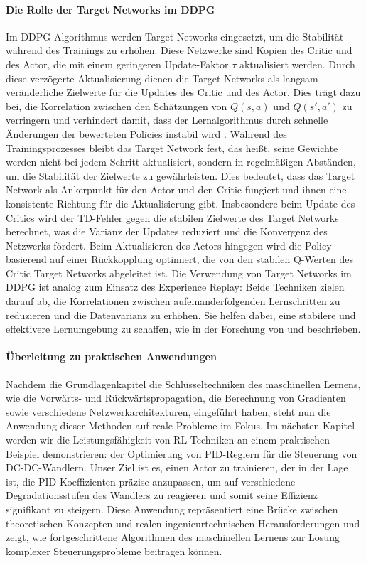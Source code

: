 \paragraph{Die Rolle der Target Networks im DDPG}
Im DDPG-Algorithmus werden Target Networks eingesetzt, um die Stabilität während des Trainings zu erhöhen. Diese Netzwerke sind Kopien des Critic und des Actor, die mit einem geringeren Update-Faktor \( \tau \) aktualisiert werden. Durch diese verzögerte Aktualisierung dienen die Target Networks als langsam veränderliche Zielwerte für die Updates des Critic und des Actor. Dies trägt dazu bei, die Korrelation zwischen den Schätzungen von \( Q(s,a) \) und \( Q(s',a') \) zu verringern und verhindert damit, dass der Lernalgorithmus durch schnelle Änderungen der bewerteten Policies instabil wird \cite{Wu2018AggregatedMultiDDPG}. Während des Trainingsprozesses bleibt das Target Network fest, das heißt, seine Gewichte werden nicht bei jedem Schritt aktualisiert, sondern in regelmäßigen Abständen, um die Stabilität der Zielwerte zu gewährleisten. Dies bedeutet, dass das Target Network als Ankerpunkt für den Actor und den Critic fungiert und ihnen eine konsistente Richtung für die Aktualisierung gibt. Insbesondere beim Update des Critics wird der TD-Fehler gegen die stabilen Zielwerte des Target Networks berechnet, was die Varianz der Updates reduziert und die Konvergenz des Netzwerks fördert. Beim Aktualisieren des Actors hingegen wird die Policy basierend auf einer Rückkopplung optimiert, die von den stabilen Q-Werten des Critic Target Networks abgeleitet ist. Die Verwendung von Target Networks im DDPG ist analog zum Einsatz des Experience Replay: Beide Techniken zielen darauf ab, die Korrelationen zwischen aufeinanderfolgenden Lernschritten zu reduzieren und die Datenvarianz zu erhöhen. Sie helfen dabei, eine stabilere und effektivere Lernumgebung zu schaffen, wie in der Forschung von \cite{Luck2019ImprovedExploration} und \cite{Wu2018AggregatedMultiDDPG} beschrieben.
 

\paragraph{Überleitung zu praktischen Anwendungen}
Nachdem die Grundlagenkapitel die Schlüsseltechniken des maschinellen Lernens, wie die Vorwärts- und Rückwärtspropagation, die Berechnung von Gradienten sowie verschiedene Netzwerkarchitekturen, eingeführt haben, steht nun die Anwendung dieser Methoden auf reale Probleme im Fokus. Im nächsten Kapitel werden wir die Leistungsfähigkeit von RL-Techniken an einem praktischen Beispiel demonstrieren: der Optimierung von PID-Reglern für die Steuerung von DC-DC-Wandlern. Unser Ziel ist es, einen Actor zu trainieren, der in der Lage ist, die PID-Koeffizienten präzise anzupassen, um auf verschiedene Degradationsstufen des Wandlers zu reagieren und somit seine Effizienz signifikant zu steigern. Diese Anwendung repräsentiert eine Brücke zwischen theoretischen Konzepten und realen ingenieurtechnischen Herausforderungen und zeigt, wie fortgeschrittene Algorithmen des maschinellen Lernens zur Lösung komplexer Steuerungsprobleme beitragen können.


